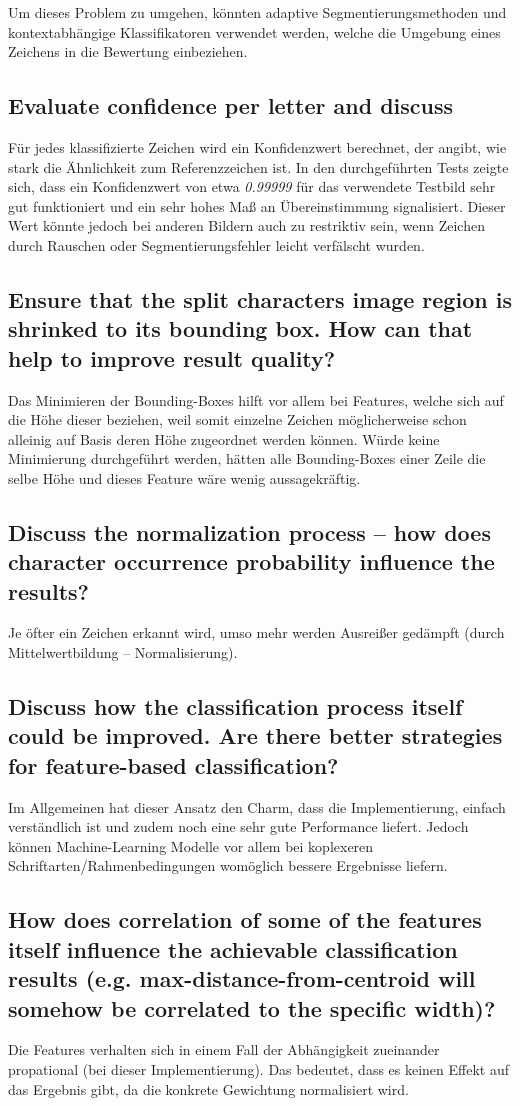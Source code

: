 Um dieses Problem zu umgehen, könnten adaptive Segmentierungsmethoden und kontextabhängige Klassifikatoren verwendet werden, welche die Umgebung eines Zeichens in die Bewertung einbeziehen.

\subsection{Evaluate confidence per letter and discuss}
Für jedes klassifizierte Zeichen wird ein Konfidenzwert berechnet, der angibt, wie stark die Ähnlichkeit zum Referenzzeichen ist. In den durchgeführten Tests zeigte sich, dass ein Konfidenzwert von etwa \textit{0.99999} für das verwendete Testbild sehr gut funktioniert und ein sehr hohes Maß an Übereinstimmung signalisiert. Dieser Wert könnte jedoch bei anderen Bildern auch zu restriktiv sein, wenn Zeichen durch Rauschen oder Segmentierungsfehler leicht verfälscht wurden.

\subsection{Ensure that the split characters image region is shrinked to its bounding box. How can that help to improve result quality?}
Das Minimieren der Bounding-Boxes hilft vor allem bei Features, welche sich auf die Höhe dieser beziehen, weil somit einzelne Zeichen möglicherweise
schon alleinig auf Basis deren Höhe zugeordnet werden können. Würde keine Minimierung durchgeführt werden, hätten alle Bounding-Boxes einer Zeile
die selbe Höhe und dieses Feature wäre wenig aussagekräftig.

\subsection{Discuss the normalization process – how does character occurrence probability influence the results?}
Je öfter ein Zeichen erkannt wird, umso mehr werden Ausreißer gedämpft (durch Mittelwertbildung -- Normalisierung).

\subsection{Discuss how the classification process itself could be improved. Are there better strategies for feature-based classification?}
Im Allgemeinen hat dieser Ansatz den Charm, dass die Implementierung, einfach verständlich ist und zudem noch eine sehr gute Performance
liefert. Jedoch können Machine-Learning Modelle vor allem bei koplexeren Schriftarten/Rahmenbedingungen womöglich bessere Ergebnisse liefern.

\subsection{How does correlation of some of the features itself influence the achievable classification results (e.g. max-distance-from-centroid will somehow be correlated to the specific width)?}
Die Features verhalten sich in einem Fall der Abhängigkeit zueinander propational (bei dieser Implementierung). Das bedeutet, dass es keinen Effekt auf das Ergebnis gibt, da die konkrete Gewichtung normalisiert wird.

